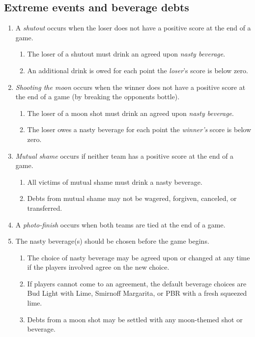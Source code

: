 \documentclass[11pt,letterpaper,twocolumn,english,DIV=calc]{scrartcl}
\begin{document}
\subsection{Extreme events and beverage debts}
\begin{enumerate}[leftmargin=2.8em, label=\thesubsection.\arabic*]
	\item A \emph{shutout} occurs when the loser does not have a positive score at the end of a game.

	\begin{enumerate}
		\item The loser of a shutout must drink an agreed upon \emph{nasty beverage}.
		\item An additional drink is owed for each point the \emph{loser}'s score is below zero.
	\end{enumerate}

	\item \emph{Shooting the moon} occurs when the winner does not have a positive score at the end of a game (by breaking the opponents bottle).

	\begin{enumerate}
		\item The loser of a moon shot must drink an agreed upon \emph{nasty beverage}.
		\item The loser owes a nasty beverage for each point the \emph{winner's} score is below zero.
	\end{enumerate}

	\item \emph{Mutual shame} occurs if neither team has a positive score at the end of a game.

	\begin{enumerate}
		\item All victims of mutual shame must drink a nasty beverage.
		\item Debts from mutual shame may not be wagered, forgiven, canceled, or transferred.
	\end{enumerate}

	\item A \emph{photo-finish} occurs when both teams are tied at the end of a game.
	\item The nasty beverage(s) should be chosen before the game begins.

	\begin{enumerate}
		\item The choice of nasty beverage may be agreed upon or changed at any time if the players involved agree on the new choice.
		\item If players cannot come to an agreement, the default beverage choices are Bud Light with Lime, Smirnoff Margarita, or PBR with a fresh squeezed lime.
		\item Debts from a moon shot may be settled with any moon-themed shot or beverage.
	\end{enumerate}


\end{enumerate}
\end{document}
